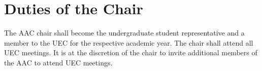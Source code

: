 \section{Duties of the Chair}
The AAC chair shall become the undergraduate student representative and a member to the UEC for the respective academic year. The chair shall attend all UEC meetings. It is at the discretion of the chair to invite additional members of the AAC to attend UEC meetings.